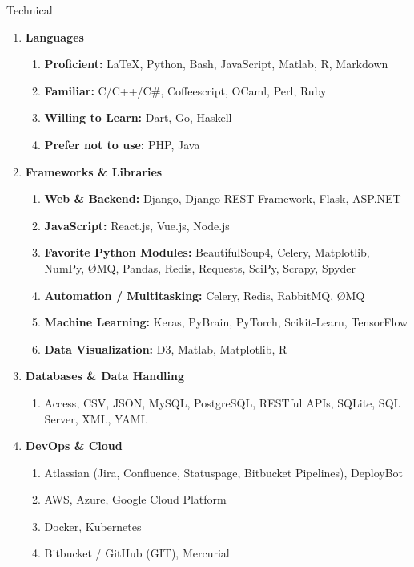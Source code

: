 \documentclass[oneside]{article}%
\begin{document}
\noindent
\huge{Technical}
\small
\begin{enumerate}[]

	\item \textbf{Languages}
		\begin{enumerate}[-]
			\item \textbf{Proficient:} \LaTeX, Python, Bash, JavaScript, Matlab, R, Markdown
			\item \textbf{Familiar:} C/C++/C\#, Coffeescript, OCaml, Perl, Ruby
			\item \textbf{Willing to Learn:} Dart, Go, Haskell
			\item \textbf{Prefer not to use:} PHP, Java
		\end{enumerate}
	
	\item \textbf{Frameworks \& Libraries}
		\begin{enumerate}[-]
			\item \textbf{Web \& Backend:} Django, Django REST Framework, Flask, ASP.NET
			\item \textbf{JavaScript:} React.js, Vue.js, Node.js
			\item \textbf{Favorite Python Modules:} BeautifulSoup4, Celery, Matplotlib, NumPy, ØMQ, Pandas, Redis, Requests, SciPy, Scrapy, Spyder
			\item \textbf{Automation / Multitasking:} Celery, Redis, RabbitMQ, ØMQ
			\item \textbf{Machine Learning:} Keras, PyBrain, PyTorch, Scikit-Learn, TensorFlow
			\item \textbf{Data Visualization:} D3, Matlab, Matplotlib, R
		\end{enumerate}
	
	\item \textbf{Databases \& Data Handling}
		\begin{enumerate}[-]
			\item Access, CSV, JSON, MySQL, PostgreSQL, RESTful APIs, SQLite, SQL Server, XML, YAML
		\end{enumerate}
	
	\item \textbf{DevOps \& Cloud}
		\begin{enumerate}[-]
			\item Atlassian (Jira, Confluence, Statuspage, Bitbucket Pipelines), DeployBot
			\item AWS, Azure, Google Cloud Platform
			\item Docker, Kubernetes
			\item Bitbucket / GitHub (GIT), Mercurial
		\end{enumerate}
	

\end{enumerate}
\end{document}
